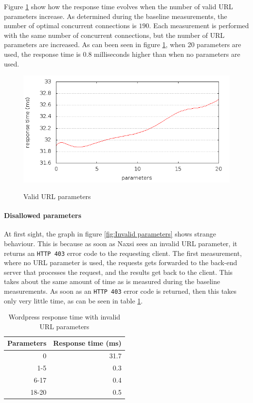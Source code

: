 \documentclass[Measurements]{subfiles}
\begin{document}
Figure \ref{fig:wordpress_with_naxsi_valid_parameters} show how the response time evolves when the number of valid \ac{URL} parameters increase. As determined during the baseline measurements, the number of optimal concurrent connections is $190$. Each measurement is performed with the same number of concurrent connections, but the number of \ac{URL} parameters are increased. As can been seen in figure \ref{fig:wordpress_with_naxsi_valid_parameters}, when 20 parameters are used, the response time is $0.8$ milliseconds higher than when no parameters are used.

\begin{figure}[H]
\caption{Valid URL parameters}
\centering
\includegraphics[scale=0.55] {images/results/wp_with_naxsi_incremented_allowed_parameters/output.png}
\label{fig:wordpress_with_naxsi_valid_parameters}
\end{figure}

\paragraph{Disallowed parameters}

At first sight, the graph in figure \ref{fig:Invalid parameters} shows strange behaviour. This is because as soon as Naxsi sees an invalid \ac{URL} parameter, it returns an \verb+HTTP 403+ error code to the requesting client. The first measurement, where no \ac{URL} parameter is used, the requests gets forwarded to the back-end server that processes the request, and the results get back to the client. This takes about the same amount of time as is measured during the baseline measurements. As soon as an \verb+HTTP 403+ error code is returned, then this takes only very little time, as can be seen in table \ref{tab:Wordpress response time with invalid URL parameters}.

\begin{table}[H]
\caption{Wordpress response time with invalid URL parameters}
\center
\begin{tabular}{|r|r|}
\hline
\textbf{Parameters} & \textbf{Response time (ms)}\\ \hline
0 & 31.7 \\ \hline
1-5 & 0.3 \\ \hline
6-17 & 0.4 \\ \hline
18-20 & 0.5 \\ \hline
\end{tabular}
\label{tab:Wordpress response time with invalid URL parameters}
\end{table}
\end{document}
